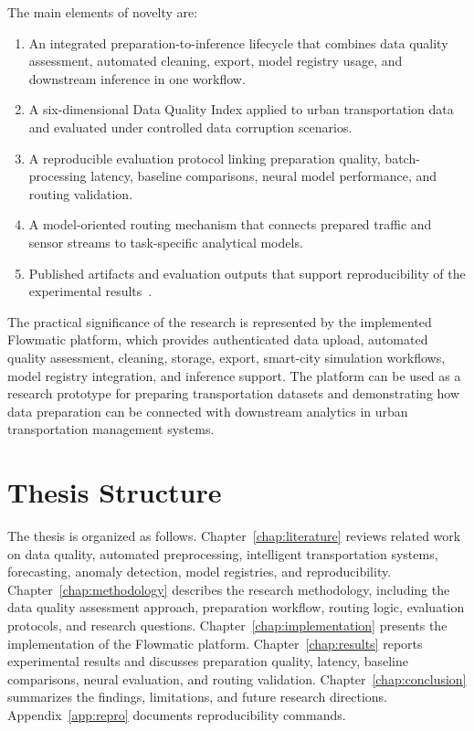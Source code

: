 The main elements of novelty are:
\begin{enumerate}
  \item An integrated preparation-to-inference lifecycle that combines data quality assessment, automated cleaning, export, model registry usage, and downstream inference in one workflow.
  \item A six-dimensional Data Quality Index applied to urban transportation data and evaluated under controlled data corruption scenarios.
  \item A reproducible evaluation protocol linking preparation quality, batch-processing latency, baseline comparisons, neural model performance, and routing validation.
  \item A model-oriented routing mechanism that connects prepared traffic and sensor streams to task-specific analytical models.
  \item Published artifacts and evaluation outputs that support reproducibility of the experimental results~\cite{kreutzberger2022mlops,wolf2020transformers}.
\end{enumerate}

The practical significance of the research is represented by the implemented Flowmatic platform, which provides authenticated data upload, automated quality assessment, cleaning, storage, export, smart-city simulation workflows, model registry integration, and inference support. The platform can be used as a research prototype for preparing transportation datasets and demonstrating how data preparation can be connected with downstream analytics in urban transportation management systems.

\section{Thesis Structure}

The thesis is organized as follows. Chapter~\ref{chap:literature} reviews related work on data quality, automated preprocessing, intelligent transportation systems, forecasting, anomaly detection, model registries, and reproducibility. Chapter~\ref{chap:methodology} describes the research methodology, including the data quality assessment approach, preparation workflow, routing logic, evaluation protocols, and research questions. Chapter~\ref{chap:implementation} presents the implementation of the Flowmatic platform. Chapter~\ref{chap:results} reports experimental results and discusses preparation quality, latency, baseline comparisons, neural evaluation, and routing validation. Chapter~\ref{chap:conclusion} summarizes the findings, limitations, and future research directions. Appendix~\ref{app:repro} documents reproducibility commands.

